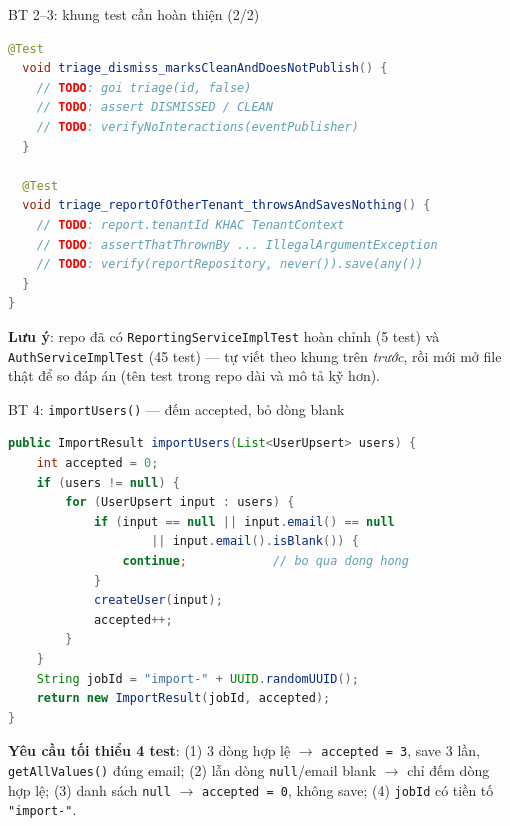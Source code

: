 \documentclass[aspectratio=169,12pt]{beamer}
\begin{document}
\begin{frame}[fragile]{BT 2--3: khung test cần hoàn thiện (2/2)}
\begin{lstlisting}[language=java,basicstyle=\ttfamily\scriptsize]
  @Test
  void triage_dismiss_marksCleanAndDoesNotPublish() {
    // TODO: goi triage(id, false)
    // TODO: assert DISMISSED / CLEAN
    // TODO: verifyNoInteractions(eventPublisher)
  }

  @Test
  void triage_reportOfOtherTenant_throwsAndSavesNothing() {
    // TODO: report.tenantId KHAC TenantContext
    // TODO: assertThatThrownBy ... IllegalArgumentException
    // TODO: verify(reportRepository, never()).save(any())
  }
}
\end{lstlisting}

  {\small \textbf{Lưu ý}: repo đã có \texttt{ReportingServiceImplTest}
  hoàn chỉnh (5 test) và \texttt{AuthServiceImplTest} (45 test) --- tự viết
  theo khung trên \emph{trước}, rồi mới mở file thật để so đáp án
  (tên test trong repo dài và mô tả kỹ hơn).}
\end{frame}

\begin{frame}[fragile]{BT 4: \texttt{importUsers()} --- đếm accepted, bỏ dòng blank}
  \vspace*{-0.2em}
\begin{lstlisting}[language=java,basicstyle=\ttfamily\scriptsize]
public ImportResult importUsers(List<UserUpsert> users) {
    int accepted = 0;
    if (users != null) {
        for (UserUpsert input : users) {
            if (input == null || input.email() == null
                    || input.email().isBlank()) {
                continue;            // bo qua dong hong
            }
            createUser(input);
            accepted++;
        }
    }
    String jobId = "import-" + UUID.randomUUID();
    return new ImportResult(jobId, accepted);
}
\end{lstlisting}

  \vspace{-0.2em}
  {\small \textbf{Yêu cầu tối thiểu 4 test}:
  (1) 3 dòng hợp lệ $\to$ \texttt{accepted = 3}, save 3 lần,
  \texttt{getAllValues()} đúng email;
  (2) lẫn dòng \texttt{null}/email blank $\to$ chỉ đếm dòng hợp lệ;
  (3) danh sách \texttt{null} $\to$ \texttt{accepted = 0}, không save;
  (4) \texttt{jobId} có tiền tố \texttt{"import-"}.}
\end{frame}
\end{document}
